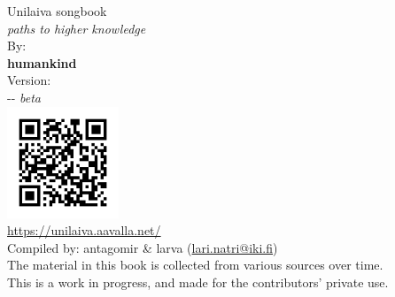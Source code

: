 \documentclass[twoside,10pt]{book}
\begin{document}
  \begin{titlepage}
    
    \thispagestyle{empty}
    \vspace*{\fill}
    \begin{center}
      \Huge Unilaiva songbook\\
      \normalsize \textit{paths to higher knowledge}\\
      \Large
      \vspace{3em}
      By:\\
      \textbf{humankind}\\
      \vspace{1em}
      Version:\\
      \the\year-\the\month-\the\day \textit{ beta}
      \\
      \vspace*{\fill}
      \includegraphics[width=0.25\textwidth]{QR_https_unilaiva_aavalla_net.png}
      \\
      {\small\url{https://unilaiva.aavalla.net/}}
      \\
      \vspace*{\fill}
      {\footnotesize Compiled by: antagomir \& larva (\href{mailto:lari.natri@iki.fi}{lari.natri@iki.fi})}
      \\
      \vspace{1.5em}
      {\scriptsize
        The material in this book is collected from various sources over time.\\
        \vspace{-1em} %
        This is a work in progress, and made for the contributors' private use.
        \vspace{-1em} %
      }
    \end{center}
  \end{titlepage}

  \tableofcontents

\end{document}
